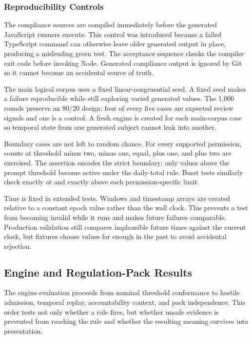 \subsubsection{Reproducibility Controls}

The compliance sources are compiled immediately before the generated JavaScript runners execute. This control was introduced because a failed TypeScript command can otherwise leave older generated output in place, producing a misleading green test. The acceptance sequence checks the compiler exit code before invoking Node. Generated compliance output is ignored by Git so it cannot become an accidental source of truth.

The main logical corpus uses a fixed linear-congruential seed. A fixed seed makes a failure reproducible while still exploring varied generated values. The 1,000 rounds preserve an 80/20 design: four of every five cases are expected review signals and one is a control. A fresh engine is created for each main-corpus case so temporal state from one generated subject cannot leak into another.

Boundary cases are not left to random chance. For every supported permission, counts at threshold minus two, minus one, equal, plus one, and plus two are exercised. The assertion encodes the strict boundary: only values above the prompt threshold become active under the daily-total rule. Burst tests similarly check exactly at and exactly above each permission-specific limit.

Time is fixed in extended tests. Windows and timestamp arrays are created relative to a constant epoch value rather than the wall clock. This prevents a test from becoming invalid while it runs and makes future failures comparable. Production validation still compares implausible future times against the current clock, but fixtures choose values far enough in the past to avoid accidental rejection.

\subsection{Engine and Regulation-Pack Results}

The engine evaluation proceeds from nominal threshold conformance to hostile admission, temporal replay, accountability context, and pack independence. This order tests not only whether a rule fires, but whether unsafe evidence is prevented from reaching the rule and whether the resulting meaning survives into presentation.

